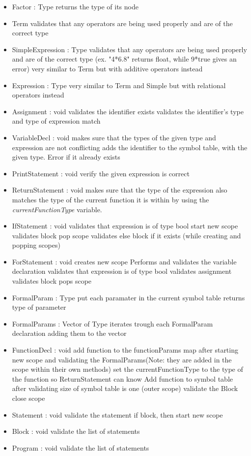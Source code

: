 \begin{itemize}
	\item Factor : Type
		\subitem returns the type of its node
	\item Term
		\subitem validates that any operators are being used properly and are of the correct type
	\item SimpleExpression : Type
		\subitem validates that any operators are being used properly and are of the correct type (ex. "4*6.8" returns float, while 9*true gives an error)
		\subitem very similar to Term but with additive operators instead
	\item Expression : Type
		\subitem very similar to Term and Simple but with relational operators instead
	\item Assignment : void
		\subitem validates the identifier exists
		\subitem validates the identifier's type and type of expression match
	\item VariableDecl : void
		\subitem makes sure that the types of the given type and expression are not conflicting
		\subitem adds the identifier to the symbol table, with the given type. Error if it already exists
	\item PrintStatement : void
		\subitem verify the given expression is correct
	\item ReturnStatement : void
		\subitem makes sure that the type of the expression also matches the type of the current function it is within by using the \textit{currentFunctionType} variable.
	\item IfStatement : void
		\subitem validates that expression is of type bool
		\subitem start new scope
		\subitem validates block
		\subitem pop scope
		\subitem validates else block if it exists (while creating and popping scopes)
	\item ForStatement : void
		\subitem creates new scope
		\subitem Performs and validates the variable declaration
		\subitem validates that expression is of type bool
		\subitem validates assignment
		\subitem validates block
		\subitem pops scope
	\item FormalParam : Type
		\subitem put each paramater in the current symbol table
		\subitem returns type of parameter
	\item FormalParams : Vector of Type
		\subitem iterates trough each FormalParam declaration adding them to the vector
	\item FunctionDecl : void
		\subitem add function to the functionParams map after starting new scope and  validating the FormalParams(Note: they are added in the scope within their own methods)
		\subitem set the currentFunctionType to the type of the function so ReturnStatement can know
		Add function to symbol table after validating size of symbol table is one (outer scope)
		\subitem validate the Block
		\subitem close scope
	\item Statement : void
		\subitem validate the statement
		\subitem if block, then start new scope
	\item Block : void
		\subitem validate the list of statements
	\item Program : void
		\subitem validate the list of statements
\end{itemize}

